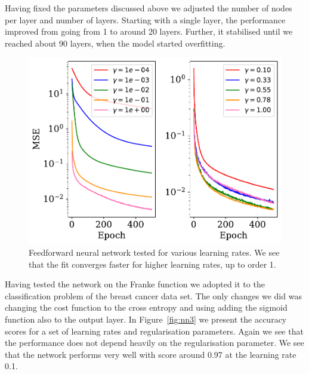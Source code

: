 \documentclass[a4paper,
amsfonts,
amssymb,
amsmath,
reprint,
showkeys,
nofootinbib,
twoside]{revtex4-2}
\begin{document}
Having fixed the parameters discussed above we adjusted the number of nodes per layer and number of layers. Starting with a single layer, the performance improved from going from 1 to around 20 layers. Further, it stabilised until we reached about 90 layers, when the model started overfitting.

\begin{figure}
    \centering
    \includegraphics[width = \columnwidth]{Figures/lr_test.pdf}
    \caption{Feedforward neural network tested for various learning rates. We see that the fit converges faster for higher learning rates, up to order 1.}
    \label{fig:nn1}
\end{figure}

Having tested the network on the Franke function we adopted it to the classification problem of the breast cancer data set. The only changes we did was changing the cost function to the cross entropy and using adding the sigmoid function also to the output layer. In Figure~\ref{fig:nn3} we present the accuracy scores for a set of learning rates and regularisation parameters. Again we see that the performance does not depend heavily on the regularisation parameter. We see that the network performs very well with score around 0.97 at the learning rate 0.1.
\end{document}
